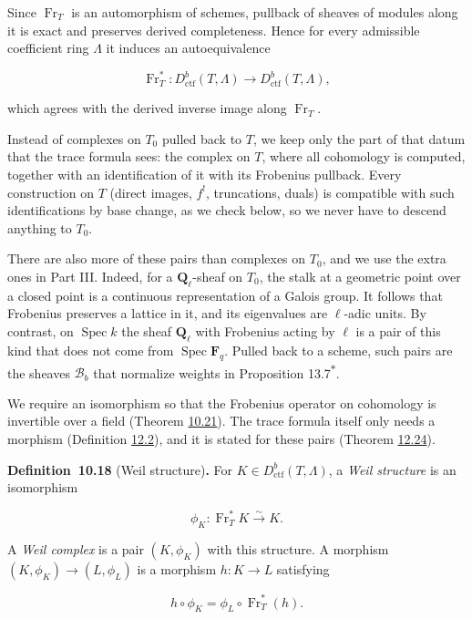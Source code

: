\documentclass[11pt]{article}
\newenvironment{bpstatement}[2]{\par\addvspace{0.6\baselineskip}\noindent\textbf{#1}#2\textbf{.}\enspace\ignorespaces}
  {\par\addvspace{0.4\baselineskip}}
\newcommand{\bpout}[1]{#1\textsuperscript{\hyperlink{bp-outside}{\ensuremath{\ast}}}}
\begin{document}
Since \(\operatorname{Fr}_T\) is an automorphism of schemes, pullback of sheaves of modules along it is exact and preserves derived completeness. Hence for every admissible coefficient ring \(\Lambda\) it induces an autoequivalence

\[
\operatorname{Fr}_T^*:
D^b_{\mathrm{ctf}}(T,\Lambda)\longrightarrow
D^b_{\mathrm{ctf}}(T,\Lambda),
\]

which agrees with the derived inverse image along \(\operatorname{Fr}_T\).

Instead of complexes on \(T_0\) pulled back to \(T\), we keep only the part of that datum that the trace formula sees: the complex on \(T\), where all cohomology is computed, together with an identification of it with its Frobenius pullback. Every construction on \(T\) (direct images, \(f^!\), truncations, duals) is compatible with such identifications by base change, as we check below, so we never have to descend anything to \(T_0\).

There are also more of these pairs than complexes on \(T_0\), and we use the extra ones in Part III. Indeed, for a \(\mathbf Q_\ell\)-sheaf on \(T_0\), the stalk at a geometric point over a closed point is a continuous representation of a Galois group. It follows that Frobenius preserves a lattice in it, and its eigenvalues are \(\ell\)-adic units. By contrast, on \(\operatorname{Spec}k\) the sheaf \(\mathbf Q_\ell\) with Frobenius acting by \(\ell\) is a pair of this kind that does not come from \(\operatorname{Spec}\mathbf F_q\). Pulled back to a scheme, such pairs are the sheaves \(\mathcal B_b\) that normalize weights in Proposition \bpout{13.7}.

We require an isomorphism so that the Frobenius operator on cohomology is invertible over a field (Theorem \hyperref[bp165]{10.21}). The trace formula itself only needs a morphism (Definition \hyperref[bp232]{12.2}), and it is stated for these pairs (Theorem \hyperref[bp298]{12.24}).

\label{bp156}%
\begin{bpstatement}{Definition~10.18}{ (Weil structure)}
For \(K\in D^b_{\mathrm{ctf}}(T,\Lambda)\), a \emph{Weil structure} is an isomorphism

\[
\phi_K:\operatorname{Fr}_T^*K\xrightarrow{\sim}K.
\]

A \emph{Weil complex} is a pair \((K,\phi_K)\) with this structure. A morphism \((K,\phi_K)\to(L,\phi_L)\) is a morphism \(h:K\to L\) satisfying

\[
h\circ\phi_K=\phi_L\circ\operatorname{Fr}_T^*(h).
\]
\end{bpstatement}
\end{document}
